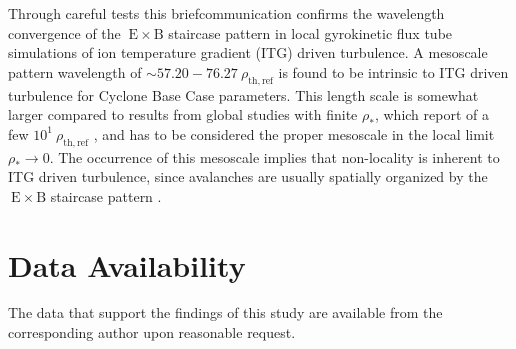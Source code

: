 \documentclass[aip, amsmath, amssymb, reprint, twocolumn]{revtex4-1}
\newcommand{\exb}{\mathrm{\:E \times B}}
\newcommand{\rhothref}{\rho_\mathrm{th,ref}}
\begin{document}
\bigskip
\bigskip
\bigskip
\bigskip
\bigskip
\bigskip

Through careful tests this briefcommunication confirms the wavelength convergence of the $\exb$ staircase pattern in local gyrokinetic flux tube simulations of ion temperature gradient (ITG) driven turbulence.
A mesoscale pattern wavelength of $\sim 57.20 - 76.27~\rhothref$ is found to be intrinsic to ITG driven turbulence for Cyclone Base Case parameters.
This length scale is somewhat larger compared to results from global studies with finite $\rho_\ast$, which report of a few $10^1~\rhothref$ \cite{pradalier2010}, and has to be considered the proper mesoscale in the local limit $\rho_\ast \rightarrow 0$.  
The occurrence of this mesoscale implies that non-locality is inherent to ITG driven turbulence, since avalanches are usually spatially organized by the $\exb$ staircase pattern \cite{mcmillan2009, pradalier2010, rath2016, peeters2016}. 



\section*{Data Availability}
The data that support the findings of this study are available from the corresponding author upon reasonable request. 
\bigskip
\bigskip
\bigskip
\bigskip
\bigskip
\bigskip


\wordcountmessage


\nocite{}
\end{document}
